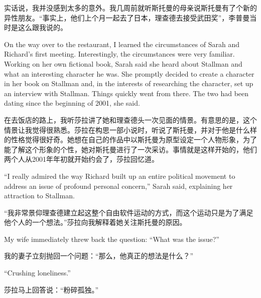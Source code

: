 \ifdefined\chs
实话说，我并没感到太多的意外。我几周前就听斯托曼的母亲说斯托曼有了个新的异性朋友。``事实上，他们上个月一起去了日本，理查德去接受武田奖''，李普曼当时是这么跟我说的。
\fi

\ifdefined\eng
On the way over to the restaurant, I learned the circumstances of Sarah and Richard's first meeting. Interestingly, the circumstances were very familiar. Working on her own fictional book, Sarah said she heard about Stallman and what an interesting character he was. She promptly decided to create a character in her book on Stallman and, in the interests of researching the character, set up an interview with Stallman. Things quickly went from there. The two had been dating since the beginning of 2001, she said.
\fi

\ifdefined\chs
在去饭店的路上，我听莎拉讲了她和理查德头一次见面的情景。有意思的是，这个情景让我觉得很熟悉。莎拉在构思一部小说时，听说了斯托曼，并对于他是什么样的性格觉得很好奇。她想在自己的作品中以斯托曼为原型设定一个人物形象，为了能了解这个形象的个性，她对斯托曼进行了一次采访。事情就是这样开始的，他们两个人从2001年年初就开始约会了，莎拉回忆道。
\fi

\ifdefined\eng
``I really admired the way Richard built up an entire political movement to address an issue of profound personal concern,'' Sarah said, explaining her attraction to Stallman.
\fi

\ifdefined\chs
``我非常景仰理查德建立起这整个自由软件运动的方式，而这个运动只是为了满足他个人的一个想法。''莎拉向我解释着她关注斯托曼的原因。
\fi

\ifdefined\eng
My wife immediately threw back the question: ``What was the issue?''
\fi

\ifdefined\chs
我的妻子立刻抛回一个问题：``那么，他真正的想法是什么？''
\fi

\ifdefined\eng
``Crushing loneliness.''
\fi

\ifdefined\chs
莎拉马上回答说：``粉碎孤独。''
\fi

